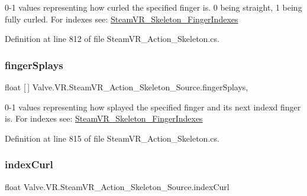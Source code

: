 0-\/1 values representing how curled the specified finger is. 0 being straight, 1 being fully curled. For indexes see\+: \mbox{\hyperlink{class_valve_1_1_v_r_1_1_steam_v_r___skeleton___finger_indexes}{Steam\+V\+R\+\_\+\+Skeleton\+\_\+\+Finger\+Indexes}} 



Definition at line 812 of file Steam\+V\+R\+\_\+\+Action\+\_\+\+Skeleton.\+cs.

\mbox{\label{class_valve_1_1_v_r_1_1_steam_v_r___action___skeleton___source_ae03d33e99edbf36ecd3fc8327d85b4e0}} 
\subsubsection{\texorpdfstring{fingerSplays}{fingerSplays}}
{\footnotesize\ttfamily float \mbox{[}$\,$\mbox{]} Valve.\+V\+R.\+Steam\+V\+R\+\_\+\+Action\+\_\+\+Skeleton\+\_\+\+Source.\+finger\+Splays\hspace{0.3cm}{\ttfamily [get]}, {}}



0-\/1 values representing how splayed the specified finger and it\textquotesingle{}s next index\textquotesingle{}d finger is. For indexes see\+: \mbox{\hyperlink{class_valve_1_1_v_r_1_1_steam_v_r___skeleton___finger_indexes}{Steam\+V\+R\+\_\+\+Skeleton\+\_\+\+Finger\+Indexes}} 



Definition at line 815 of file Steam\+V\+R\+\_\+\+Action\+\_\+\+Skeleton.\+cs.

\mbox{\label{class_valve_1_1_v_r_1_1_steam_v_r___action___skeleton___source_a79620bcbfdd095ddd03a1bb72da2bd0b}} 
\subsubsection{\texorpdfstring{indexCurl}{indexCurl}}
{\footnotesize\ttfamily float Valve.\+V\+R.\+Steam\+V\+R\+\_\+\+Action\+\_\+\+Skeleton\+\_\+\+Source.\+index\+Curl\hspace{0.3cm}{\ttfamily [get]}}



